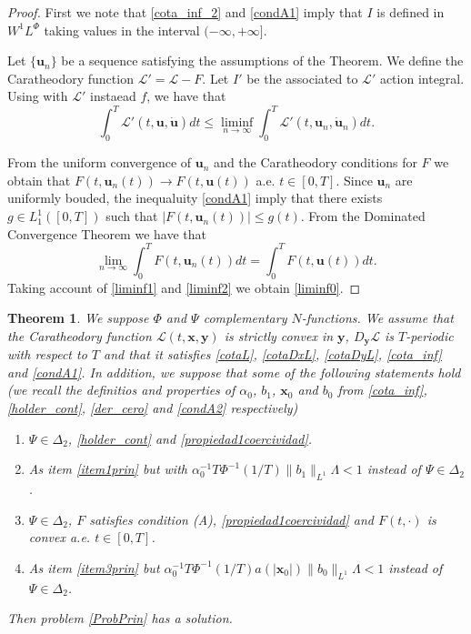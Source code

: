 \documentclass[twoside]{article}
\newtheorem{thm}{Theorem}[section]
\theoremstyle{remark}
\newcommand{\lphi}{L^{\Phi}}
\newcommand{\wphi}{W^{1}\lphi}
\renewcommand{\b}[1]{\boldsymbol{#1}}
\renewcommand{\leq}{\leqslant}
\begin{document}
\begin{proof} First we note that \eqref{cota_inf_2} and \eqref{condA1} imply that $I$ is defined in $\wphi$ taking values in the interval $(-\infty,+\infty]$. 

Let $\{\b{u}_n\}$ be a sequence  satisfying the assumptions of the Theorem.   We define the Caratheodory function $\mathcal{L}'=\mathcal{L}-F$. Let $I'$ be the associated to $\mathcal{L}'$ action integral. Using  \cite[Th. 2.1, p. 243]{ekeland1999convex} with  $\mathcal{L}'$ instaead $f$, we have that
\begin{equation}\label{liminf1}\int_0^T\mathcal{L}'(t,\b{u},\b{\dot{u}})dt\leq \liminf_{n\to\infty}\int_0^T\mathcal{L}'(t,\b{u}_n,\b{\dot{u}}_n)dt.
\end{equation}

From the uniform convergence of $\b{u}_n$ and the Caratheodory conditions for $F$ we obtain that $F(t,\b{u}_n(t))\to F(t,\b{u}(t))$ a.e. $t\in[0,T]$.  Since $\b{u}_n$ are uniformly bouded, the inequaluity  \eqref{condA1} imply that there exists $g\in L_1^1([0,T])$ such that $|F(t,\b{u}_n(t))|\leq g(t)$. From the Dominated Convergence Theorem we have that 
\begin{equation}\label{liminf2}\lim_{n\to\infty}\int_0^TF(t,\b{u}_n(t))dt=\int_0^TF(t,\b{u}(t))dt.
\end{equation}
Taking account of \eqref{liminf1} and  \eqref{liminf2} we obtain \eqref{liminf0}.

\end{proof}


\begin{thm} We suppose $\Phi$ and $\Psi$ complementary $N$-functions. We assume that the Caratheodory function $\mathcal{L}(t,\b{x},\b{y})$ is strictly convex in $\b{y}$, $D_{\b{y}}\mathcal{L}$ is $T$-periodic with respect to $T$  and that it satisfies \eqref{cotaL}, \eqref{cotaDxL}, \eqref{cotaDyL}, \eqref{cota_inf} and  \eqref{condA1}. In addition, we suppose that some of the following statements hold (we recall the definitios and properties of $\alpha_0$, $b_1$, $\b{x}_0$ and $b_0$ from \eqref{cota_inf}, \eqref{holder_cont}, \eqref{der_cero} and \eqref{condA2} respectively)
\begin{enumerate}
  \item\label{item1prin} $\Psi\in\Delta_2$,  \eqref{holder_cont} and \eqref{propiedad1coercividad}.
\item  As item \ref{item1prin} but with $\alpha_0^{-1}T\Phi^{-1}\left(1/T\right)\|b_1\|_{L^1}\Lambda<1$ instead of $\Psi\in\Delta_2$.

\item\label{item3prin} $\Psi\in\Delta_2$,  $F$ satisfies condition (A), \eqref{propiedad1coercividad} and  $F(t,\cdot)$ is  convex  a.e. $t\in [0,T]$.

\item\label{item4prin} As item \ref{item3prin} but $\alpha_0^{-1}T\Phi^{-1}\left(1/T\right)a(|\b{x}_0|)\|b_0\|_{L^1} \Lambda<1$ instead of $\Psi\in\Delta_2$.

\end{enumerate}
Then problem \eqref{ProbPrin} has a solution.
\end{thm}
\end{document}
